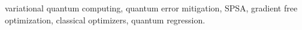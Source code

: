 \documentclass[conference]{IEEEtran}
\begin{document}
\begin{IEEEkeywords}
variational quantum computing, quantum error mitigation, SPSA, gradient free optimization, classical optimizers, quantum regression.
\end{IEEEkeywords}

\glsresetall




%

\newpage


\end{document}
